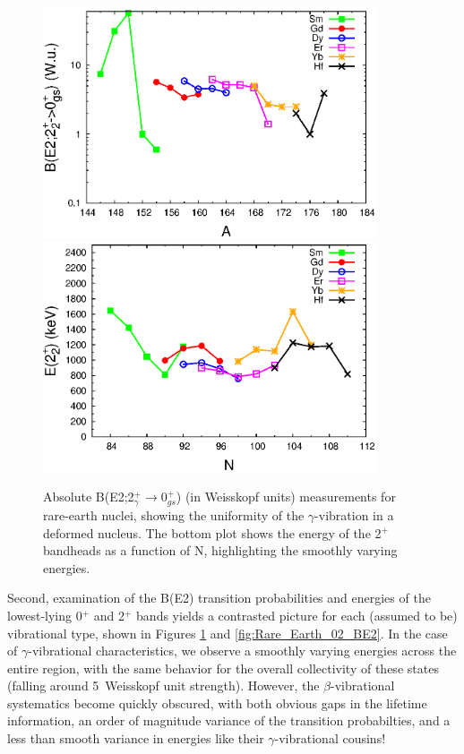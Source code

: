 \begin{figure}[h!]
\begin{center}
\includegraphics[width=0.88\textwidth]{Rare_Earth_2g_BE2.eps}\\
\includegraphics[width=0.88\textwidth]{Rare_Earth_2g_N.eps}
\end{center}
\caption{Absolute B(E2;2$^+_\gamma\rightarrow$0$^+_{gs}$) (in Weisskopf units) measurements for rare-earth nuclei, showing the uniformity of the $\gamma$-vibration in a deformed nucleus. The bottom plot shows the energy of the 2$^+$ bandheads as a function of N, highlighting the smoothly varying energies. \label{fig:Rare_Earth_2g_BE2}}
\end{figure}

Second, examination of the B(E2) transition probabilities and energies of the lowest-lying 0$^+$ and 2$^+$ bands yields a contrasted picture for each (assumed to be) vibrational type, shown in Figures \ref{fig:Rare_Earth_2g_BE2} and \ref{fig:Rare_Earth_02_BE2}. In the case of $\gamma$-vibrational characteristics, we observe a smoothly varying energies across the entire region, with the same behavior for the overall collectivity of these states (falling around 5~Weisskopf unit strength). However, the $\beta$-vibrational systematics become quickly obscured, with both obvious gaps in the lifetime information, an order of magnitude variance of the transition probabilties, and a less than smooth variance in energies like their $\gamma$-vibrational cousins! 



